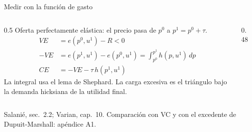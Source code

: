 \documentclass[aspectratio=169,11pt]{beamer}
\newcommand{\fuente}[1]{\par\vfill{\small\color{cGris}#1\par}}
\newcommand{\ejes}[4]{%
  \draw[eje] (0,0) -- (#1,0) node[below] {#3};
  \draw[eje] (0,0) -- (0,#2) node[left] {#4};}
\begin{document}
\begin{frame}{Medir con la función de gasto}
  \begin{columns}[c]
    \begin{column}{0.5\textwidth}
      \small
      Oferta perfectamente elástica: el precio pasa de $p^0$ a $p^1=p^0+\tau$.
      \begin{align*}
        VE &= e(p^0, u^1) - R < 0\\
        -VE &= e(p^1,u^1) - e(p^0,u^1) = \int_{p^0}^{p^1} h(p,u^1)\,dp\\
        CE &= -VE - \tau\,h(p^1,u^1)
      \end{align*}
      \pause
      La integral usa el lema de Shephard. La carga excesiva es el triángulo bajo la demanda hicksiana de la utilidad final.
    \end{column}
    \begin{column}{0.48\textwidth}
      \centering
    \end{column}
  \end{columns}
  \fuente{Salanié, sec.~2.2; Varian, cap.~10. Comparación con VC y con el excedente de Dupuit-Marshall: apéndice A1.}
\end{frame}
\end{document}
